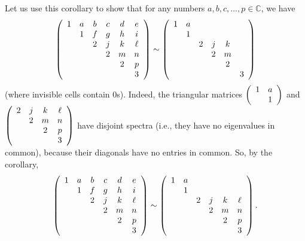 \documentclass[numbers=enddot,12pt,final,onecolumn,notitlepage]{scrartcl}%
\numberwithin{exer}{subsection}
\theoremstyle{definition}
\begin{document}
Let us use this corollary to show that for any numbers $a,b,c,\ldots
,p\in\mathbb{C}$, we have%
\[
\left(
\begin{array}
[c]{cccccc}%
1 & a & b & c & d & e\\
& 1 & f & g & h & i\\
&  & 2 & j & k & \ell\\
&  &  & 2 & m & n\\
&  &  &  & 2 & p\\
&  &  &  &  & 3
\end{array}
\right)  \sim\left(
\begin{array}
[c]{cccccc}%
1 & a &  &  &  & \\
& 1 &  &  &  & \\
&  & 2 & j & k & \\
&  &  & 2 & m & \\
&  &  &  & 2 & \\
&  &  &  &  & 3
\end{array}
\right)
\]
(where invisible cells contain $0$s). Indeed, the triangular matrices $\left(
%
\begin{array}
[c]{cc}%
1 & a\\
& 1
\end{array}
\right)  $ and $\left(
\begin{array}
[c]{cccc}%
2 & j & k & \ell\\
& 2 & m & n\\
&  & 2 & p\\
&  &  & 3
\end{array}
\right)  $ have disjoint spectra (i.e., they have no eigenvalues in common),
because their diagonals have no entries in common. So, by the corollary,
\[
\left(
\begin{array}
[c]{cccccc}%
1 & a & b & c & d & e\\
& 1 & f & g & h & i\\
&  & 2 & j & k & \ell\\
&  &  & 2 & m & n\\
&  &  &  & 2 & p\\
&  &  &  &  & 3
\end{array}
\right)  \sim\left(
\begin{array}
[c]{cccccc}%
1 & a &  &  &  & \\
& 1 &  &  &  & \\
&  & 2 & j & k & \ell\\
&  &  & 2 & m & n\\
&  &  &  & 2 & p\\
&  &  &  &  & 3
\end{array}
\right)  .
\]
\end{document}
